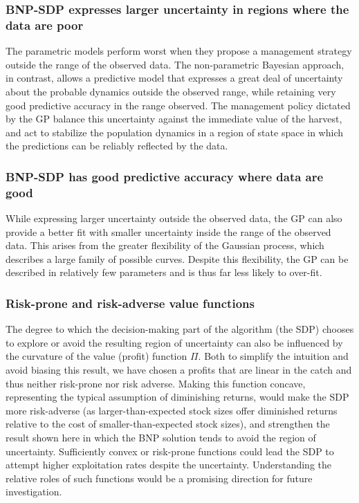 \documentclass[author-year, review]{elsarticle} %
\begin{document}
\subsubsection{BNP-SDP expresses larger uncertainty in regions where the
data are
poor}\label{bnp-sdp-expresses-larger-uncertainty-in-regions-where-the-data-are-poor}

The parametric models perform worst when they propose a management
strategy outside the range of the observed data. The non-parametric
Bayesian approach, in contrast, allows a predictive model that expresses
a great deal of uncertainty about the probable dynamics outside the
observed range, while retaining very good predictive accuracy in the
range observed. The management policy dictated by the GP balance this
uncertainty against the immediate value of the harvest, and act to
stabilize the population dynamics in a region of state space in which
the predictions can be reliably reflected by the data.

\subsubsection{BNP-SDP has good predictive accuracy where data are
good}\label{bnp-sdp-has-good-predictive-accuracy-where-data-are-good}

While expressing larger uncertainty outside the observed data, the GP
can also provide a better fit with smaller uncertainty inside the range
of the observed data. This arises from the greater flexibility of the
Gaussian process, which describes a large family of possible curves.
Despite this flexibility, the GP can be described in relatively few
parameters and is thus far less likely to over-fit.

\subsubsection{Risk-prone and risk-adverse value
functions}\label{risk-prone-and-risk-adverse-value-functions}

The degree to which the decision-making part of the algorithm (the SDP)
chooses to explore or avoid the resulting region of uncertainty can also
be influenced by the curvature of the value (profit) function $\Pi$.
Both to simplify the intuition and avoid biasing this result, we have
chosen a profits that are linear in the catch and thus neither
risk-prone nor risk adverse. Making this function concave, representing
the typical assumption of diminishing returns, would make the SDP more
risk-adverse (as larger-than-expected stock sizes offer diminished
returns relative to the cost of smaller-than-expected stock sizes), and
strengthen the result shown here in which the BNP solution tends to
avoid the region of uncertainty. Sufficiently convex or risk-prone
functions could lead the SDP to attempt higher exploitation rates
despite the uncertainty. Understanding the relative roles of such
functions would be a promising direction for future investigation.
\end{document}
